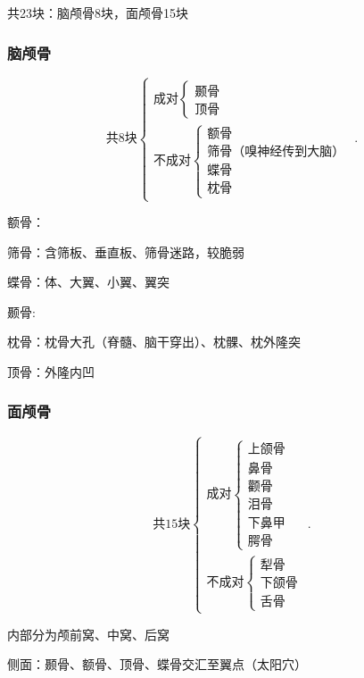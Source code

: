 共23块：脑颅骨8块，面颅骨15块

\subsubsection{脑颅骨}%
\label{subsub:脑颅骨}
\[
    \text{共8块}
    \begin{cases}
        \text{成对}
        \begin{cases}
            \text{颞骨}\\ 
            \text{顶骨}
        \end{cases}\\
        \text{不成对}
        \begin{cases}
            \text{额骨}\\ 
            \text{筛骨（嗅神经传到大脑）}\\ 
            \text{蝶骨}\\ 
            \text{枕骨}
        \end{cases}
    \end{cases}
.\] 
\begin{notation}
    额骨：
\end{notation}

\begin{notation}
    筛骨：含筛板、垂直板、筛骨迷路，较脆弱
\end{notation}

\begin{notation}
    蝶骨：体、大翼、小翼、翼突
\end{notation}

\begin{notation}
    颞骨:
\end{notation}

\begin{notation}
    枕骨：枕骨大孔（脊髓、脑干穿出）、枕髁、枕外隆突

    顶骨：外隆内凹
\end{notation}

\subsubsection{面颅骨}%
\label{subsub:面颅骨}
\[
    \text{共15块}
    \begin{cases}
        \text{成对}
        \begin{cases}
            \text{上颌骨}\\ 
            \text{鼻骨}\\ 
            \text{颧骨}\\ 
            \text{泪骨}\\ 
            \text{下鼻甲}\\ 
            \text{腭骨}
        \end{cases}\\
        \text{不成对}
        \begin{cases}
            \text{犁骨}\\ 
            \text{下颌骨}\\ 
            \text{舌骨}
        \end{cases}
    \end{cases}
.\] 

内部分为颅前窝、中窝、后窝

侧面：颞骨、额骨、顶骨、蝶骨交汇至翼点（太阳穴）
